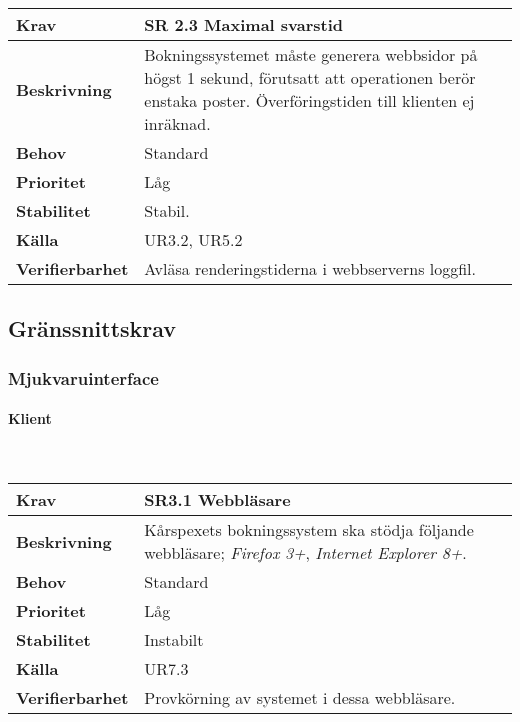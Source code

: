 \documentclass[a4paper, twoside, 11pt, titlepage]{article}
\begin{document}
	\begin {table} [ht] \begin{tabular} { p{2.6cm} p{12.5cm} }
		\hline
		\sffamily\textbf{Krav} & \sffamily\textbf{SR 2.3 Maximal svarstid } \\
		\hline
		\sffamily\textbf{Beskrivning} & Bokningssystemet måste generera webbsidor på högst 1 sekund, förutsatt att operationen berör enstaka poster. Överföringstiden till klienten ej inräknad.  \\
		\hline
		\sffamily\textbf{Behov} & Standard  \\
		\hline
		\sffamily\textbf{Prioritet} & Låg  \\
		\hline
		\sffamily\textbf{Stabilitet} & Stabil.  \\
		\hline
		\sffamily\textbf{Källa} &  UR3.2, UR5.2  \\
		\hline
		\sffamily\textbf{Verifierbarhet} & Avläsa renderingstiderna i webbserverns loggfil.  \\
		\hline
	\end{tabular} \end{table} \FloatBarrier


	\subsection{Gränssnittskrav}



		\subsubsection{Mjukvaruinterface}



			\paragraph{Klient}\

			\begin {table} [ht] \begin{tabular} { p{2.6cm} p{12.5cm} }
				\hline
				\sffamily\textbf{Krav} & \sffamily\textbf{SR3.1 Webbläsare } \\
				\hline
				\sffamily\textbf{Beskrivning} & Kårspexets bokningssystem ska stödja följande webbläsare; \emph{Firefox 3+}, \emph{Internet Explorer 8+}.   \\
				\hline
				\sffamily\textbf{Behov} & Standard  \\
				\hline
				\sffamily\textbf{Prioritet} & Låg  \\
				\hline
				\sffamily\textbf{Stabilitet} & Instabilt  \\
				\hline
				\sffamily\textbf{Källa} & UR7.3  \\
				\hline
				\sffamily\textbf{Verifierbarhet} & Provkörning av systemet i dessa webbläsare.  \\
				\hline
			\end{tabular} \end{table} \FloatBarrier
			\vspace{6mm}
\end{document}
